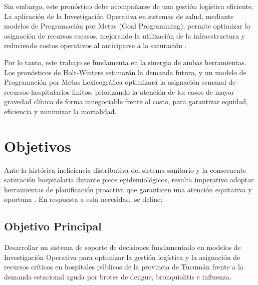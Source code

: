 \documentclass[conference]{IEEEtran}
\begin{document}
Sin embargo, este pronóstico debe acompañarse de una gestión logística eficiente. La aplicación de la Investigación Operativa en sistemas de salud, mediante modelos de Programación por Metas (Goal Programming), permite optimizar la asignación de recursos escasos, mejorando la utilización de la infraestructura y reduciendo costos operativos al anticiparse a la saturación \cite{ref4, ref5}.

Por lo tanto, este trabajo se fundamenta en la sinergia de ambas herramientas. Los pronósticos de Holt-Winters estimarán la demanda futura, y un modelo de Programación por Metas Lexicográfica optimizará la asignación semanal de recursos hospitalarios finitos, priorizando la atención de los casos de mayor gravedad clínica de forma innegociable frente al costo, para garantizar equidad, eficiencia y minimizar la mortalidad.

\section{Objetivos}
Ante la histórica ineficiencia distributiva del sistema sanitario y la consecuente saturación hospitalaria durante picos epidemiológicos, resulta imperativo adoptar herramientas de planificación proactiva que garanticen una atención equitativa y oportuna \cite{ref6}. En respuesta a esta necesidad, se define:

\subsection{Objetivo Principal}
Desarrollar un sistema de soporte de decisiones fundamentado en modelos de Investigación Operativa para optimizar la gestión logística y la asignación de recursos críticos en hospitales públicos de la provincia de Tucumán frente a la demanda estacional aguda por brotes de dengue, bronquiolitis e influenza.
\end{document}
